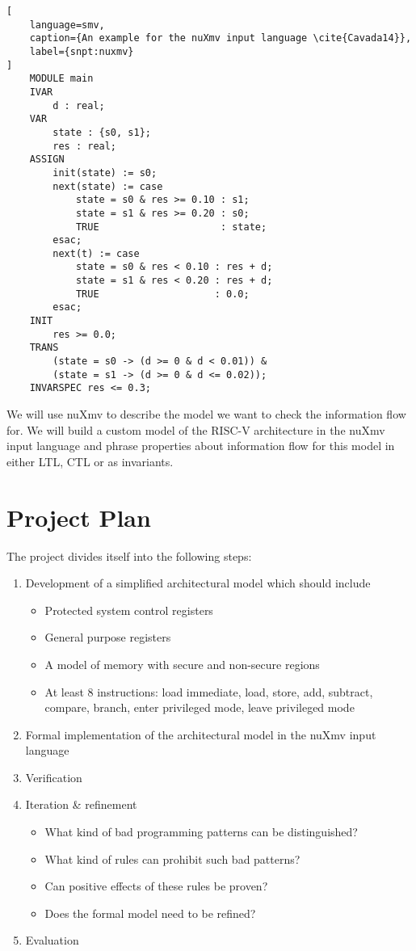 \documentclass{securem}
\begin{document}
\begin{lstlisting}[
    language=smv,
    caption={An example for the nuXmv input language \cite{Cavada14}},
    label={snpt:nuxmv}
]
    MODULE main
    IVAR
        d : real;
    VAR
        state : {s0, s1};
        res : real;
    ASSIGN
        init(state) := s0;
        next(state) := case
            state = s0 & res >= 0.10 : s1;
            state = s1 & res >= 0.20 : s0;
            TRUE                     : state;
        esac;
        next(t) := case
            state = s0 & res < 0.10 : res + d;
            state = s1 & res < 0.20 : res + d;
            TRUE                    : 0.0;
        esac;
    INIT
        res >= 0.0;
    TRANS
        (state = s0 -> (d >= 0 & d < 0.01)) &
        (state = s1 -> (d >= 0 & d <= 0.02));
    INVARSPEC res <= 0.3;
\end{lstlisting}

We will use nuXmv to describe the model we want to check the information flow for.
We will build a custom model of the RISC-V architecture in the nuXmv input language and phrase properties about information flow for this model in either LTL, CTL or as invariants.

\section{Project Plan}

The project divides itself into the following steps:
\begin{enumerate}
    \item Development of a simplified architectural model which should include
    \begin{itemize}
        \item Protected system control registers
        \item General purpose registers
        \item A model of memory with secure and non-secure regions
        \item At least 8 instructions: load immediate, load, store, add, subtract, compare, branch, enter privileged mode, leave privileged mode
    \end{itemize}
    \item Formal implementation of the architectural model in the nuXmv input language
    \item Verification
    \item Iteration \& refinement
    \begin{itemize}
        \item What kind of bad programming patterns can be distinguished?
        \item What kind of rules can prohibit such bad patterns?
        \item Can positive effects of these rules be proven?
        \item Does the formal model need to be refined?
    \end{itemize}
    \item Evaluation
\end{enumerate}



\end{document}
